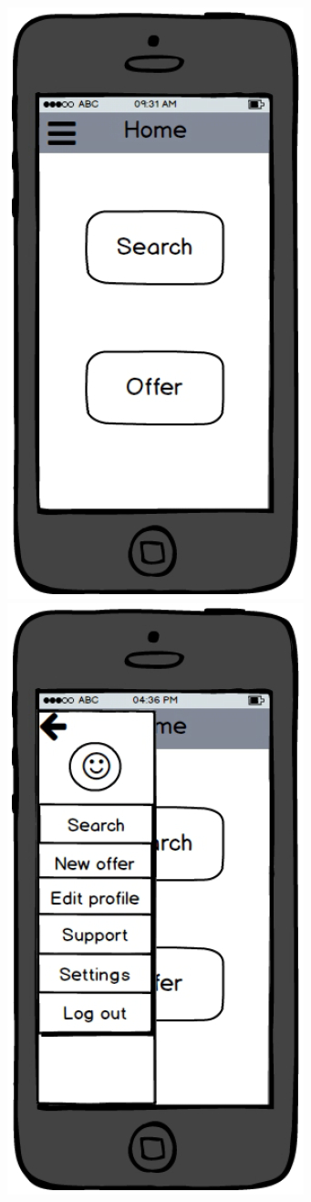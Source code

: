 \documentclass[11pt,twoside,a4paper]{report}
\begin{document}
\includegraphics[scale=0.3]{home.jpg}
\includegraphics[scale=0.3]{home2.jpg}
\end{document}
